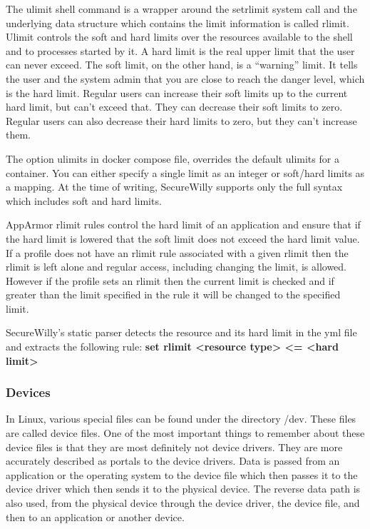 The ulimit shell command is a wrapper around the setrlimit system call and the underlying data structure which contains the limit information is called rlimit. Ulimit controls the soft and hard limits over the resources available to the shell and to processes started by it. A hard limit is the real upper limit that the user can never exceed. The soft limit, on the other hand, is a “warning” limit. It tells the user and the system admin that you are close to reach the danger level, which is the hard limit. Regular users can increase their soft limits up to the current hard limit, but can’t exceed that. They can decrease their soft limits to zero. Regular users can also decrease their hard limits to zero, but they can’t increase them.

The option ulimits in docker compose file, overrides the default ulimits for a container. You can either specify a single limit as an integer or soft/hard limits as a mapping. At the time of writing, SecureWilly supports only the full syntax which includes soft and hard limits. 

AppArmor rlimit rules control the hard limit of an application and ensure that if the hard limit is lowered that the soft limit does not exceed the hard limit value. If a profile does not have an rlimit rule associated with a given rlimit then the rlimit is left alone and regular access, including changing the limit, is allowed. However if the profile sets an rlimit then the current limit is checked and if greater than the limit specified in the rule it will be changed to the specified limit.

SecureWilly's static parser detects the resource and its hard limit in the yml file and extracts the following rule:
\textbf{set rlimit \textless resource type\textgreater{} \textless = \textless hard limit\textgreater{}}

\subsubsection{Devices}
In Linux, various special files can be found under the directory /dev. These files are called device files. One of the most important things to remember about these device files is that they are most definitely not device drivers. They are more accurately described as portals to the device drivers. Data is passed from an application or the operating system to the device file which then passes it to the device driver which then sends it to the physical device. The reverse data path is also used, from the physical device through the device driver, the device file, and then to an application or another device. \cite{devices}

